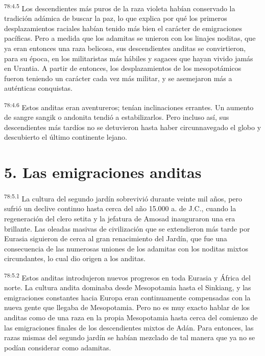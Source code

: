 \par
\textsuperscript{78:4.5} Los descendientes más puros de la raza violeta habían conservado la tradición adámica de buscar la paz, lo que explica por qué los primeros desplazamientos raciales habían tenido más bien el carácter de emigraciones pacíficas. Pero a medida que los adamitas se unieron con los linajes noditas, que ya eran entonces una raza belicosa, sus descendientes anditas se convirtieron, para su época, en los militaristas más hábiles y sagaces que hayan vivido jamás en Urantia. A partir de entonces, los desplazamientos de los mesopotámicos fueron teniendo un carácter cada vez más militar, y se asemejaron más a auténticas conquistas.

\par
\textsuperscript{78:4.6} Estos anditas eran aventureros; tenían inclinaciones errantes. Un aumento de sangre sangik o andonita tendió a estabilizarlos. Pero incluso así, sus descendientes más tardíos no se detuvieron hasta haber circunnavegado el globo y descubierto el último continente lejano.

\section*{5. Las emigraciones anditas}
\par
\textsuperscript{78:5.1} La cultura del segundo jardín sobrevivió durante veinte mil años, pero sufrió un declive continuo hasta cerca del año 15.000 a. de J.C., cuando la regeneración del clero setita y la jefatura de Amosad inauguraron una era brillante. Las oleadas masivas de civilización que se extendieron más tarde por Eurasia siguieron de cerca al gran renacimiento del Jardín, que fue una consecuencia de las numerosas uniones de los adamitas con los noditas mixtos circundantes, lo cual dio origen a los anditas.

\par
\textsuperscript{78:5.2} Estos anditas introdujeron nuevos progresos en toda Eurasia y África del norte. La cultura andita dominaba desde Mesopotamia hasta el Sinkiang, y las emigraciones constantes hacia Europa eran continuamente compensadas con la nueva gente que llegaba de Mesopotamia. Pero no es muy exacto hablar de los anditas como de una raza en la propia Mesopotamia hasta cerca del comienzo de las emigraciones finales de los descendientes mixtos de Adán. Para entonces, las razas mismas del segundo jardín se habían mezclado de tal manera que ya no se podían considerar como adamitas.

